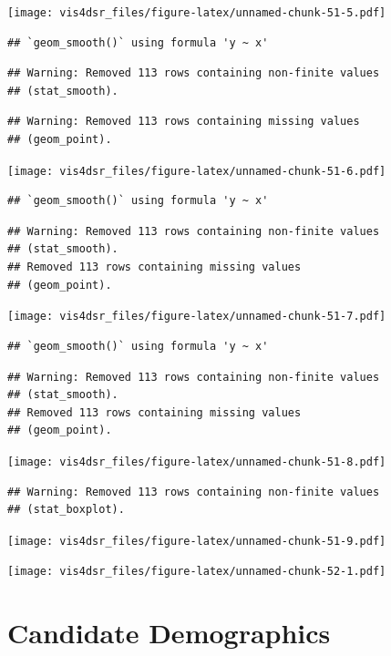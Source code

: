 \documentclass[
]{krantz}
\begin{document}
\texttt{[image: vis4dsr\_files/figure-latex/unnamed-chunk-51-5.pdf]}

\begin{verbatim}
## `geom_smooth()` using formula 'y ~ x'
\end{verbatim}

\begin{verbatim}
## Warning: Removed 113 rows containing non-finite values
## (stat_smooth).
\end{verbatim}

\begin{verbatim}
## Warning: Removed 113 rows containing missing values
## (geom_point).
\end{verbatim}

\texttt{[image: vis4dsr\_files/figure-latex/unnamed-chunk-51-6.pdf]}

\begin{verbatim}
## `geom_smooth()` using formula 'y ~ x'
\end{verbatim}

\begin{verbatim}
## Warning: Removed 113 rows containing non-finite values
## (stat_smooth).
## Removed 113 rows containing missing values
## (geom_point).
\end{verbatim}

\texttt{[image: vis4dsr\_files/figure-latex/unnamed-chunk-51-7.pdf]}

\begin{verbatim}
## `geom_smooth()` using formula 'y ~ x'
\end{verbatim}

\begin{verbatim}
## Warning: Removed 113 rows containing non-finite values
## (stat_smooth).
## Removed 113 rows containing missing values
## (geom_point).
\end{verbatim}

\texttt{[image: vis4dsr\_files/figure-latex/unnamed-chunk-51-8.pdf]}

\begin{verbatim}
## Warning: Removed 113 rows containing non-finite values
## (stat_boxplot).
\end{verbatim}

\texttt{[image: vis4dsr\_files/figure-latex/unnamed-chunk-51-9.pdf]}

\texttt{[image: vis4dsr\_files/figure-latex/unnamed-chunk-52-1.pdf]}

\hypertarget{candidate-demographics}{%
\section*{Candidate Demographics}\label{candidate-demographics}}
\end{document}
